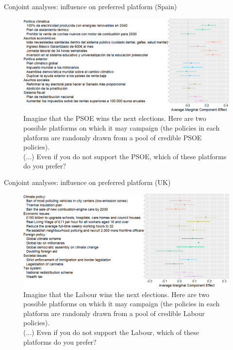 \documentclass[aspectratio=169,xcolor=dvipsnames, 11pt,mathserif]{beamer}
\begin{document}
\begin{framefont}{\small}
\begin{frame}{Conjoint analyses: influence on preferred platform (Spain) \hyperlink{conjoint_r_fr}{}\label{conjoint_r_es}} 
    \bbvs \ip {}
    \ee
    \begin{figure}\vspace{-.4cm}
        \centering 
        \caption{Imagine that the PSOE wins the next elections. Here are two possible platforms on which it may campaign (the policies in each platform are randomly drawn from a pool of credible PSOE policies).\\
		(...) Even if you do not support the PSOE, which of these platforms do you prefer? }
        \vspace{-.2cm} 
        \includegraphics[height=.7\textheight]{../figures/ES/ca_r.png} 
    \end{figure}
\end{frame}

\begin{frame}{Conjoint analyses: influence on preferred platform (UK) \hyperlink{conjoint_r_fr}{}\label{conjoint_r_uk}} 
    \bbvs \ip {}
    \ee
    \begin{figure}\vspace{-.4cm}
        \centering 
        \caption{Imagine that the Labour wins the next elections. Here are two possible platforms on which it may campaign (the policies in each platform are randomly drawn from a pool of credible Labour policies).\\
		(...) Even if you do not support the Labour, which of these platforms do you prefer? }
        \vspace{-.2cm} 
        \includegraphics[height=.7\textheight]{../figures/UK/ca_r.png} 
    \end{figure}
\end{frame}


\end{framefont}
\end{document}
